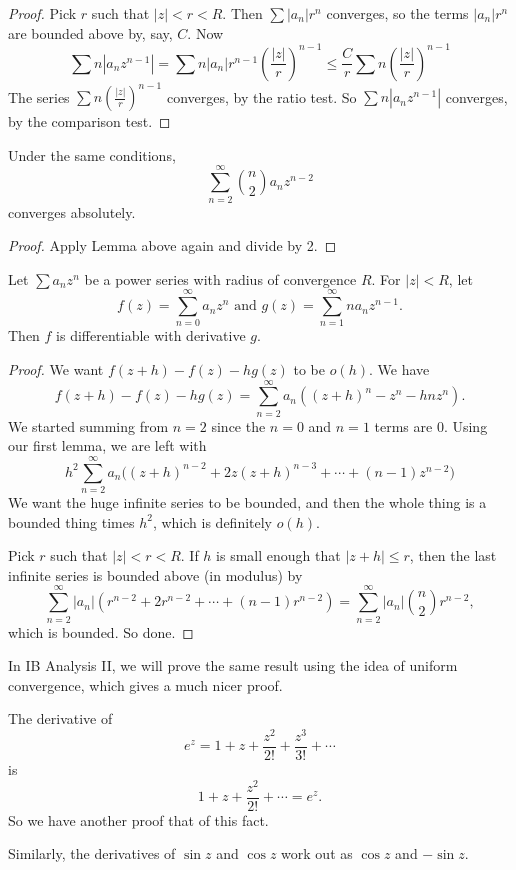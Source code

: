 \documentclass[a4paper]{article}
\begin{document}
\begin{proof}
  Pick $r$ such that $|z| < r < R$. Then $\sum |a_n| r^n$ converges, so the terms $|a_n|r^n$ are bounded above by, say, $C$. Now
  \[
    \sum n|a_n z^{n - 1}| = \sum n|a_n|r^{n - 1}\left(\frac{|z|}{r}\right)^{n - 1} \leq \frac{C}{r}\sum n\left(\frac{|z|}{r}\right)^{n - 1}
  \]
  The series $\sum n\left(\frac{|z|}{r}\right)^{n - 1}$ converges, by the ratio test. So $\sum n|a_n z^{n - 1}|$ converges, by the comparison test.
\end{proof}

\begin{cor}
  Under the same conditions,
  \[
    \sum_{n = 2}^\infty \binom{n}{2}a_n z^{n -2 }
  \]
  converges absolutely.
\end{cor}

\begin{proof}
  Apply Lemma above again and divide by 2.
\end{proof}

\begin{thm}
  Let $\sum a_n z^n$ be a power series with radius of convergence $R$. For $|z| < R$, let
  \[
    f(z) = \sum_{n = 0}^\infty a_n z^n\text{ and }g(z) = \sum_{n = 1}^\infty na_nz^{n - 1}.
  \]
  Then $f$ is differentiable with derivative $g$.
\end{thm}

\begin{proof}
  We want $f(z + h) - f(z) - hg(z)$ to be $o(h)$. We have
  \[
    f(z + h) - f(z) - hg(z) = \sum_{n = 2}^\infty a_n ((z + h)^n - z^n - hnz^n).
  \]
  We started summing from $n = 2$ since the $n = 0$ and $n = 1$ terms are 0. Using our first lemma, we are left with
  \[
    h^2\sum_{n = 2}^\infty a_n \big((z + h)^{n - 2} + 2z(z + h)^{n - 3} + \cdots + (n - 1)z^{n - 2}\big)
  \]
  We want the huge infinite series to be bounded, and then the whole thing is a bounded thing times $h^2$, which is definitely $o(h)$.

  Pick $r$ such that $|z| < r < R$. If $h$ is small enough that $|z + h| \leq r$, then the last infinite series is bounded above (in modulus) by
  \[
    \sum_{n = 2}^\infty|a_n|(r^{n - 2} + 2r^{n - 2} + \cdots + (n - 1)r^{n - 2}) = \sum_{n = 2}^\infty |a_n|\binom{n}{2}r^{n -2 },
  \]
  which is bounded. So done.
\end{proof}
In IB Analysis II, we will prove the same result using the idea of uniform convergence, which gives a much nicer proof.

\begin{eg}
  The derivative of
  \[
    e^z = 1 + z + \frac{z^2}{2!} + \frac{z^3}{3!} + \cdots
  \]
  is
  \[
    1 + z + \frac{z^2}{2!} + \cdots = e^z.
  \]
  So we have another proof that of this fact.

  Similarly, the derivatives of $\sin z$ and $\cos z$ work out as $\cos z$ and $-\sin z$.
\end{eg}
\end{document}
